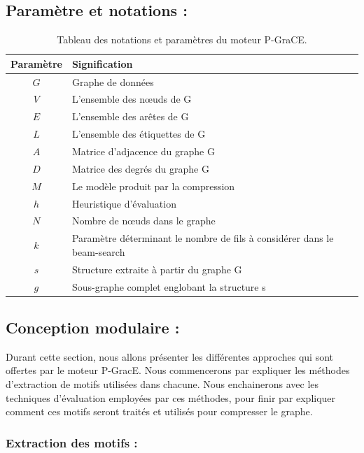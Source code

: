 \documentclass[a4paper,oneside,12pt]{report}
\theoremstyle{definition}
\begin{document}
		\subsection{Paramètre et notations :}
		
			\begin{table}[H]
		\centering
		\begin{tabular}{|c|L{12cm}|}
		\hline Paramètre & Signification \\ \hline\hline 
		$G$ & Graphe de données \\ \hline
		$V$ & L'ensemble des nœuds de G\\ \hline
		$E$ & L'ensemble des arêtes de G \\ \hline
		$L$ & L'ensemble des étiquettes de G \\ \hline
		$A$ & Matrice d'adjacence du graphe G\\ \hline
		$D$ & Matrice des degrés du graphe G\\ \hline
		$M$ & Le modèle produit par la compression\\ \hline
		$h$ & Heuristique d'évaluation \\ \hline
		$N$ & Nombre de nœuds dans le graphe \\ \hline
		$k$ & Paramètre déterminant le nombre de fils à considérer dans le beam-search\\ \hline
		$s$ & Structure extraite à partir du graphe G\\ \hline
		$g$ & Sous-graphe complet englobant la structure s\\ \hline
		\end{tabular}
		\caption{Tableau des notations et paramètres du moteur P-GraCE.}	
		\label{notk2grace}		
	\end{table}
		
		\subsection{Conception modulaire :}
		
		Durant cette section, nous allons présenter les différentes approches qui sont offertes par le moteur P-GracE. Nous commencerons par expliquer les méthodes d'extraction de motifs utilisées dans chacune. Nous enchainerons avec les techniques d'évaluation employées par ces méthodes, pour finir par expliquer comment ces motifs seront traités et utilisés pour compresser le graphe. 	
		
		
		\subsubsection{Extraction des motifs :}
\end{document}
